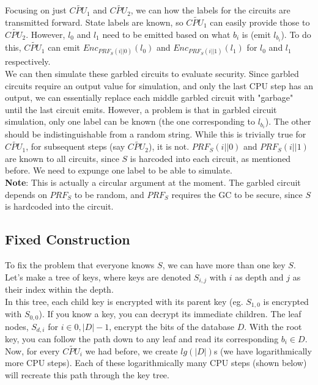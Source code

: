 
Focusing on just $\widetilde{CPU_{1}}$ and $\widetilde{CPU_{2}}$, we can how the labels for the circuits are transmitted forward. State labels are known, so $\widetilde{CPU_{1}}$ can easily provide those to $\widetilde{CPU_{2}}$. However, $l_{0}$ and $l_{1}$ need to be emitted based on what $b_{i}$ is (emit $l_{b_{i}}$). To do this, $\widetilde{CPU_{1}}$ can emit $Enc_{PRF_{S}(i || 0)}(l_{0})$ and $Enc_{PRF_{S}(i || 1)}(l_{1})$ for $l_{0}$ and $l_{1}$ respectively.\\

We can then simulate these garbled circuits to evaluate security. Since garbled circuits require an output value for simulation, and only the last CPU step has an output, we can essentially replace each middle garbled circuit with "garbage" until the last circuit emits. However, a problem is that in garbled circuit simulation, only one label can be known (the one corresponding to $l_{b_{i}}$). The other should be indistinguishable from a random string. While this is trivially true for $\widetilde{CPU_{1}}$, for subsequent steps (say $\widetilde{CPU_{2}}$), it is not. $PRF_{S} (i || 0)$ and $PRF_{S} (i || 1)$ are known to all circuits, since $S$ is harcoded into each circuit, as mentioned before. We need to expunge one label to be able to simulate.\\

\textbf{Note}: This is actually a circular argument at the moment. The garbled circuit depends on $PRF_{S}$ to be random, and $PRF_{S}$ requires the GC to be secure, since $S$ is hardcoded into the circuit.

\subsection{Fixed Construction}
To fix the problem that everyone knows $S$, we can have more than one key $S$. Let's make a tree of keys, where keys are denoted $S_{i,j}$ with $i$ as depth and $j$ as their index within the depth.\\


In this tree, each child key is encrypted with its parent key (eg. $S_{1,0}$ is encrypted with $S_{0,0}$). If you know a key, you can decrypt its immediate children. The leaf nodes, $S_{d,i}$ for $i \in {0,|D|-1}$, encrypt the bits of the database $D$. With the root key, you can follow the path down to any leaf and read its corresponding $b_{i} \in D$.\\
Now, for every $\widetilde{CPU_{i}}$ we had before, we create $lg(|D|)$s (we have logarithmically more CPU steps). Each of these logarithmically many CPU steps (shown below) will recreate this path through the key tree.\\ 

